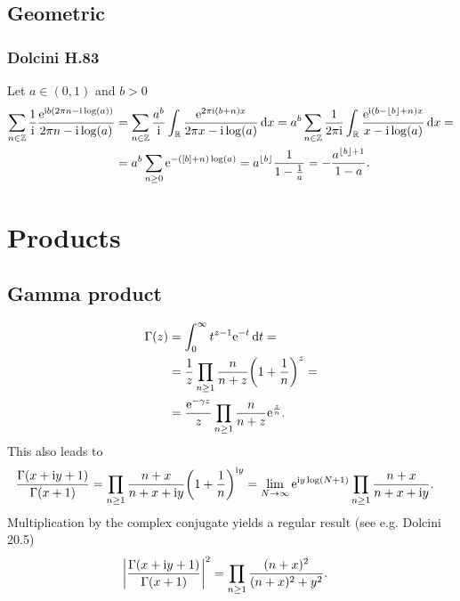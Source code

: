 \documentclass[english, parskip=full]{scrartcl}
\begin{document}
\subsection{Geometric}
\subsubsection{Dolcini H.83}
Let $a\in(0,1)$ and $b>0$
\begin{align}
\sum_{n\in\mathbb{Z}} \frac{1}{\i} \frac{\powe{\i b\kla*{2\pi n - \i\log(a)}}}{2\pi n - \i\log(a)} &= \sum_{n\in\mathbb{Z}} \frac{a^b}{\i} \intr{ \frac{\powe{2\pi\i (b+n)x}}{2\pi x - \i\log(a)}}{x} = a^b \sum_{n\in\mathbb{Z}} \frac{1}{2\pi\i} \intr{\frac{\powe{\i (b - \lfloor b\rfloor +n)x}}{x - \i \log (a)}}{x} = \\
&= a^b \sum_{n\ge 0} \powe{- ([b] + n) \log(a)} = a^{\lfloor b\rfloor} \frac{1}{1 - \frac{1}{a}} = - \frac{a^{\lfloor b\rfloor + 1}}{1 - a}.
\end{align}
\section{Products}
\subsection{Gamma product}
\begin{align}
\Gamma(z) &= \intx{0}{\infty}{t^{z-1} \powe{-t}}{t} = \\
&= \frac{1}{z} \prod_{n\ge 1} \frac{n}{n+z} \kla*{1 + \frac{1}{n}}^z = \\
&= \frac{\powe{-\gamma z}}{z} \prod_{n\ge 1} \frac{n}{n+z} \powe{\frac{z}{n}}.
\end{align}
This also leads to
\begin{align}
\frac{\Gamma(x+\i y+1)}{\Gamma(x+1)} &= \prod_{n\ge 1} \frac{n+x}{n+x+\i y} \kla*{1 + \frac{1}{n}}^{\i y} = \lim_{N\rightarrow\infty} \powe{\i y \log(N+1)} \prod_{n\ge 1} \frac{n+x}{n+x+\i y}.
\end{align}
Multiplication by the complex conjugate yields a regular result (see e.g. Dolcini 20.5)
\begin{align}
\abs*{\frac{\Gamma(x+\i y + 1)}{\Gamma(x+1)}}^2 &= \prod_{n\ge 1} \frac{(n+x)^2}{(n+x)^2 + y^2}.
\end{align}


\end{document}
